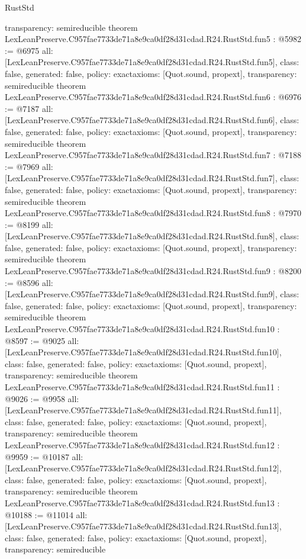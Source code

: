 \begin{lexlean}{RustStd}
\begin{coremodule}
{  transparency: semireducible
}
theorem LexLeanPreserve.C957fae7733de71a8e9ca0df28d31cdad.R24.RustStd.fun5 : @5982 := @6975 {
  all: [LexLeanPreserve.C957fae7733de71a8e9ca0df28d31cdad.R24.RustStd.fun5],
  class: false,
  generated: false,
  policy: exact{axioms: [Quot.sound, propext]},
  transparency: semireducible
}
theorem LexLeanPreserve.C957fae7733de71a8e9ca0df28d31cdad.R24.RustStd.fun6 : @6976 := @7187 {
  all: [LexLeanPreserve.C957fae7733de71a8e9ca0df28d31cdad.R24.RustStd.fun6],
  class: false,
  generated: false,
  policy: exact{axioms: [Quot.sound, propext]},
  transparency: semireducible
}
theorem LexLeanPreserve.C957fae7733de71a8e9ca0df28d31cdad.R24.RustStd.fun7 : @7188 := @7969 {
  all: [LexLeanPreserve.C957fae7733de71a8e9ca0df28d31cdad.R24.RustStd.fun7],
  class: false,
  generated: false,
  policy: exact{axioms: [Quot.sound, propext]},
  transparency: semireducible
}
theorem LexLeanPreserve.C957fae7733de71a8e9ca0df28d31cdad.R24.RustStd.fun8 : @7970 := @8199 {
  all: [LexLeanPreserve.C957fae7733de71a8e9ca0df28d31cdad.R24.RustStd.fun8],
  class: false,
  generated: false,
  policy: exact{axioms: [Quot.sound, propext]},
  transparency: semireducible
}
theorem LexLeanPreserve.C957fae7733de71a8e9ca0df28d31cdad.R24.RustStd.fun9 : @8200 := @8596 {
  all: [LexLeanPreserve.C957fae7733de71a8e9ca0df28d31cdad.R24.RustStd.fun9],
  class: false,
  generated: false,
  policy: exact{axioms: [Quot.sound, propext]},
  transparency: semireducible
}
theorem LexLeanPreserve.C957fae7733de71a8e9ca0df28d31cdad.R24.RustStd.fun10 : @8597 := @9025 {
  all: [LexLeanPreserve.C957fae7733de71a8e9ca0df28d31cdad.R24.RustStd.fun10],
  class: false,
  generated: false,
  policy: exact{axioms: [Quot.sound, propext]},
  transparency: semireducible
}
theorem LexLeanPreserve.C957fae7733de71a8e9ca0df28d31cdad.R24.RustStd.fun11 : @9026 := @9958 {
  all: [LexLeanPreserve.C957fae7733de71a8e9ca0df28d31cdad.R24.RustStd.fun11],
  class: false,
  generated: false,
  policy: exact{axioms: [Quot.sound, propext]},
  transparency: semireducible
}
theorem LexLeanPreserve.C957fae7733de71a8e9ca0df28d31cdad.R24.RustStd.fun12 : @9959 := @10187 {
  all: [LexLeanPreserve.C957fae7733de71a8e9ca0df28d31cdad.R24.RustStd.fun12],
  class: false,
  generated: false,
  policy: exact{axioms: [Quot.sound, propext]},
  transparency: semireducible
}
theorem LexLeanPreserve.C957fae7733de71a8e9ca0df28d31cdad.R24.RustStd.fun13 : @10188 := @11014 {
  all: [LexLeanPreserve.C957fae7733de71a8e9ca0df28d31cdad.R24.RustStd.fun13],
  class: false,
  generated: false,
  policy: exact{axioms: [Quot.sound, propext]},
  transparency: semireducible
}
\end{coremodule}
\end{lexlean}

